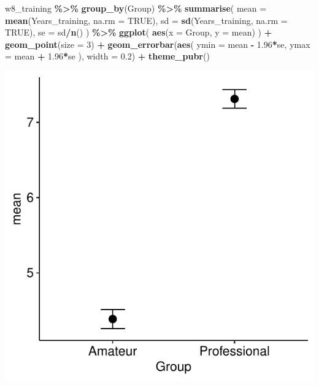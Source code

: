 \documentclass[
]{book}
\newenvironment{Shaded}{\begin{snugshade}}{\end{snugshade}}
\newcommand{\AttributeTok}[1]{\textcolor[rgb]{0.13,0.29,0.53}{#1}}
\newcommand{\ConstantTok}[1]{\textcolor[rgb]{0.56,0.35,0.01}{#1}}
\newcommand{\DecValTok}[1]{\textcolor[rgb]{0.00,0.00,0.81}{#1}}
\newcommand{\FloatTok}[1]{\textcolor[rgb]{0.00,0.00,0.81}{#1}}
\newcommand{\FunctionTok}[1]{\textcolor[rgb]{0.13,0.29,0.53}{\textbf{#1}}}
\newcommand{\NormalTok}[1]{#1}
\newcommand{\SpecialCharTok}[1]{\textcolor[rgb]{0.81,0.36,0.00}{\textbf{#1}}}
\begin{document}
\begin{Shaded}
\begin{Highlighting}[]
\NormalTok{w8\_training }\SpecialCharTok{\%\textgreater{}\%}
  \FunctionTok{group\_by}\NormalTok{(Group) }\SpecialCharTok{\%\textgreater{}\%}
  \FunctionTok{summarise}\NormalTok{(}
    \AttributeTok{mean =} \FunctionTok{mean}\NormalTok{(Years\_training, }\AttributeTok{na.rm =} \ConstantTok{TRUE}\NormalTok{),}
    \AttributeTok{sd =} \FunctionTok{sd}\NormalTok{(Years\_training, }\AttributeTok{na.rm =} \ConstantTok{TRUE}\NormalTok{),}
    \AttributeTok{se =}\NormalTok{ sd}\SpecialCharTok{/}\FunctionTok{n}\NormalTok{()}
\NormalTok{  ) }\SpecialCharTok{\%\textgreater{}\%}
  \FunctionTok{ggplot}\NormalTok{(}
    \FunctionTok{aes}\NormalTok{(}\AttributeTok{x =}\NormalTok{ Group, }\AttributeTok{y =}\NormalTok{ mean)}
\NormalTok{  ) }\SpecialCharTok{+}
  \FunctionTok{geom\_point}\NormalTok{(}\AttributeTok{size =} \DecValTok{3}\NormalTok{) }\SpecialCharTok{+}
  \FunctionTok{geom\_errorbar}\NormalTok{(}\FunctionTok{aes}\NormalTok{(}
    \AttributeTok{ymin =}\NormalTok{ mean }\SpecialCharTok{{-}} \FloatTok{1.96}\SpecialCharTok{*}\NormalTok{se,}
    \AttributeTok{ymax =}\NormalTok{ mean }\SpecialCharTok{+} \FloatTok{1.96}\SpecialCharTok{*}\NormalTok{se}
\NormalTok{  ), }\AttributeTok{width =} \FloatTok{0.2}\NormalTok{) }\SpecialCharTok{+}
  \FunctionTok{theme\_pubr}\NormalTok{()}
\end{Highlighting}
\end{Shaded}

\begin{center}\includegraphics{_main_files/figure-latex/unnamed-chunk-140-1} \end{center}
\end{document}
